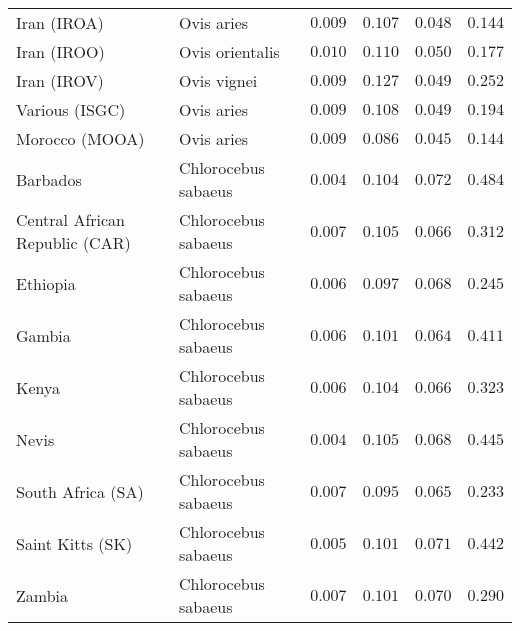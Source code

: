 \documentclass{article}
\begin{document}
\begin{center}
\begin{longtable}{|l|l|r|r|r|r|}
            Iran (IROA)                    & Ovis aries          & $ 0.009$        & $ 0.107$                & $ 0.048$    & $ 0.144$                       \\
            Iran (IROO)                    & Ovis orientalis     & $ 0.010$        & $ 0.110$                & $ 0.050$    & $ 0.177$                       \\
            Iran (IROV)                    & Ovis vignei         & $ 0.009$        & $ 0.127$                & $ 0.049$    & $ 0.252$                       \\
            Various (ISGC)                 & Ovis aries          & $ 0.009$        & $ 0.108$                & $ 0.049$    & $ 0.194$                       \\
            Morocco (MOOA)                 & Ovis aries          & $ 0.009$        & $ 0.086$                & $ 0.045$    & $ 0.144$                       \\
            Barbados                       & Chlorocebus sabaeus & $ 0.004$        & $ 0.104$                & $ 0.072$    & $ 0.484$                       \\
            Central African Republic (CAR) & Chlorocebus sabaeus & $ 0.007$        & $ 0.105$                & $ 0.066$    & $ 0.312$                       \\
            Ethiopia                       & Chlorocebus sabaeus & $ 0.006$        & $ 0.097$                & $ 0.068$    & $ 0.245$                       \\
            Gambia                         & Chlorocebus sabaeus & $ 0.006$        & $ 0.101$                & $ 0.064$    & $ 0.411$                       \\
            Kenya                          & Chlorocebus sabaeus & $ 0.006$        & $ 0.104$                & $ 0.066$    & $ 0.323$                       \\
            Nevis                          & Chlorocebus sabaeus & $ 0.004$        & $ 0.105$                & $ 0.068$    & $ 0.445$                       \\
            South Africa (SA)              & Chlorocebus sabaeus & $ 0.007$        & $ 0.095$                & $ 0.065$    & $ 0.233$                       \\
            Saint Kitts (SK)               & Chlorocebus sabaeus & $ 0.005$        & $ 0.101$                & $ 0.071$    & $ 0.442$                       \\
            Zambia                         & Chlorocebus sabaeus & $ 0.007$        & $ 0.101$                & $ 0.070$    & $ 0.290$                       \\

\end{longtable}
\end{center}
\end{document}
